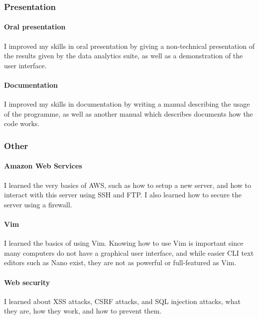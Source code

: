         \subsubsection{Presentation}
            \paragraph{Oral presentation}
            I improved my skills in oral presentation by giving a non-technical presentation of the results given by the data analytics suite, as well as a demonstration of the user interface.
            \paragraph{Documentation}
            I improved my skills in documentation by writing a manual describing the usage of the programme, as well as another manual which describes documents how the code works.
        \subsubsection{Other}
            \paragraph{Amazon Web Services}
            I learned the very basics of AWS, such as how to setup a new server, and how to interact with this server using SSH and FTP. I also learned how to secure the server using a firewall.
            \paragraph{Vim}
            I learned the basics of using Vim. Knowing how to use Vim is important since many computers do not have a graphical user interface, and while easier CLI text editors such as Nano exist, they are not as powerful or full-featured as Vim.
            \paragraph{Web security}
            I learned about XSS attacks, CSRF attacks, and SQL injection attacks, what they are, how they work, and how to prevent them.
